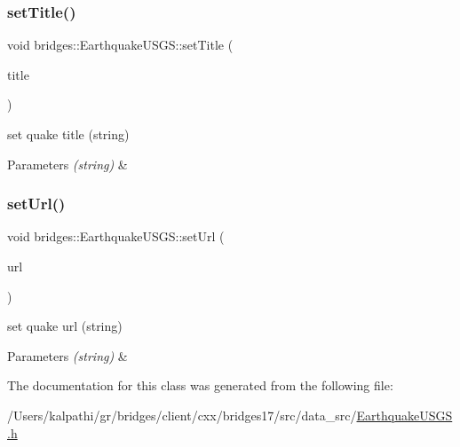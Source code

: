 \subsubsection{\texorpdfstring{set\+Title()}{setTitle()}}
{\footnotesize\ttfamily void bridges\+::\+Earthquake\+U\+S\+G\+S\+::set\+Title (\begin{DoxyParamCaption}\item[{string}]{title }\end{DoxyParamCaption})\hspace{0.3cm}{\ttfamily [inline]}}

set quake title (string)


\begin{DoxyParams}{Parameters}
{\em (string)} & \\
\hline
\end{DoxyParams}
\mbox{\label{classbridges_1_1_earthquake_u_s_g_s_ac07298c50e03955d167a2ca38c5150be}} 
\subsubsection{\texorpdfstring{set\+Url()}{setUrl()}}
{\footnotesize\ttfamily void bridges\+::\+Earthquake\+U\+S\+G\+S\+::set\+Url (\begin{DoxyParamCaption}\item[{string}]{url }\end{DoxyParamCaption})\hspace{0.3cm}{\ttfamily [inline]}}

set quake url (string)


\begin{DoxyParams}{Parameters}
{\em (string)} & \\
\hline
\end{DoxyParams}


The documentation for this class was generated from the following file\+:\begin{DoxyCompactItemize}
\item 
/\+Users/kalpathi/gr/bridges/client/cxx/bridges17/src/data\+\_\+src/\mbox{\hyperlink{_earthquake_u_s_g_s_8h}{Earthquake\+U\+S\+G\+S.\+h}}\end{DoxyCompactItemize}

